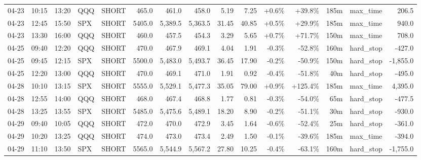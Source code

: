 \documentclass[11pt,a4paper,twoside]{article}
\begin{document}
\begin{landscape}
\begin{center}
\begin{longtable}{>{\color{txtmain}}l l l l l r r r r r r r r >{\color{txtmain}}l r}
04-23 & 10:15 & 13:20 & QQQ & SHORT & 465.0 & 461.0 & 458.0 & 5.19 & 7.25 & \textcolor{wingreen}{+0.6\%} & \textcolor{wingreen}{+39.8\%} & 185m & max\_time & \textcolor{wingreen}{206.5} \\
04-23 & 12:45 & 15:50 & SPX & SHORT & 5405.0 & 5,389.5 & 5,363.5 & 31.45 & 40.85 & \textcolor{wingreen}{+0.5\%} & \textcolor{wingreen}{+29.9\%} & 185m & max\_time & \textcolor{wingreen}{940.0} \\
04-23 & 13:30 & 16:00 & QQQ & SHORT & 460.0 & 457.5 & 454.3 & 3.29 & 5.65 & \textcolor{wingreen}{+0.7\%} & \textcolor{wingreen}{+71.7\%} & 150m & max\_time & \textcolor{wingreen}{708.0} \\
04-25 & 09:40 & 12:20 & QQQ & SHORT & 470.0 & 467.9 & 469.1 & 4.04 & 1.91 & \textcolor{lossred}{-0.3\%} & \textcolor{lossred}{-52.8\%} & 160m & hard\_stop & \textcolor{lossred}{-427.0} \\
04-25 & 09:45 & 12:15 & SPX & SHORT & 5500.0 & 5,483.0 & 5,493.7 & 36.45 & 17.90 & \textcolor{lossred}{-0.2\%} & \textcolor{lossred}{-50.9\%} & 150m & hard\_stop & \textcolor{lossred}{-1,855.0} \\
04-25 & 12:20 & 13:00 & QQQ & SHORT & 470.0 & 469.1 & 471.0 & 1.91 & 0.92 & \textcolor{lossred}{-0.4\%} & \textcolor{lossred}{-51.8\%} & 40m & hard\_stop & \textcolor{lossred}{-495.0} \\
04-28 & 10:10 & 13:15 & SPX & SHORT & 5555.0 & 5,529.1 & 5,477.3 & 35.05 & 79.00 & \textcolor{wingreen}{+0.9\%} & \textcolor{wingreen}{+125.4\%} & 185m & max\_time & \textcolor{wingreen}{4,395.0} \\
04-28 & 12:55 & 14:00 & QQQ & SHORT & 468.0 & 467.4 & 468.8 & 1.77 & 0.81 & \textcolor{lossred}{-0.3\%} & \textcolor{lossred}{-54.0\%} & 65m & hard\_stop & \textcolor{lossred}{-477.5} \\
04-28 & 13:25 & 13:55 & SPX & SHORT & 5485.0 & 5,475.6 & 5,489.1 & 18.20 & 8.90 & \textcolor{lossred}{-0.2\%} & \textcolor{lossred}{-51.1\%} & 30m & hard\_stop & \textcolor{lossred}{-930.0} \\
04-29 & 09:40 & 10:05 & QQQ & SHORT & 472.0 & 470.0 & 472.9 & 3.45 & 1.64 & \textcolor{lossred}{-0.6\%} & \textcolor{lossred}{-52.4\%} & 25m & hard\_stop & \textcolor{lossred}{-361.0} \\
04-29 & 10:20 & 13:25 & QQQ & SHORT & 474.0 & 473.0 & 473.4 & 2.49 & 1.50 & \textcolor{lossred}{-0.1\%} & \textcolor{lossred}{-39.6\%} & 185m & max\_time & \textcolor{lossred}{-394.0} \\
04-29 & 11:10 & 13:50 & SPX & SHORT & 5565.0 & 5,544.9 & 5,567.2 & 27.80 & 10.25 & \textcolor{lossred}{-0.4\%} & \textcolor{lossred}{-63.1\%} & 160m & hard\_stop & \textcolor{lossred}{-1,755.0} \\

\end{longtable}
\end{center}
\end{landscape}
\end{document}
